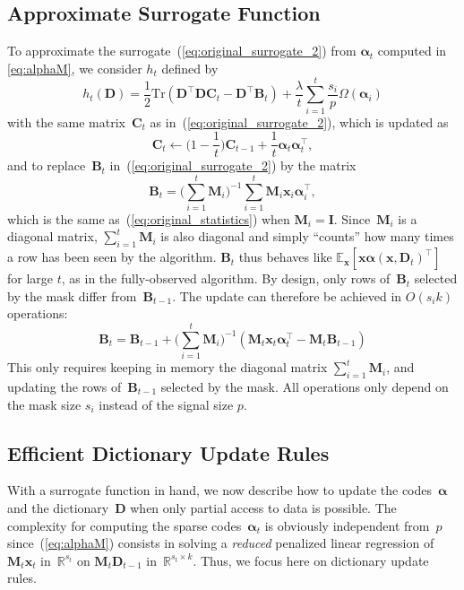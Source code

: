 \documentclass{article}
\def\E{{\mathbb E}}
\def\Real{{\mathbb{R}}}
\def\x{{\mathbf x}}
\def\I{{\mathbf I}}
\def\B{{\mathbf B}}
\def\C{{\mathbf C}}
\def\D{{\mathbf D}}
\def\x{{\mathbf x}}
\def\Real{{\mathbb R}}
\def\M{{\mathbf M}}
\newcommand{\transpose}{^\top}
\newcommand{\balpha}{\boldsymbol{\alpha}}
\begin{document}
\subsection{Approximate Surrogate Function}
To approximate the surrogate~(\ref{eq:original_surrogate_2}) from $\balpha_t$ computed in \eqref{eq:alphaM},
we consider $h_t$ defined by
\begin{equation}
    \label{eq:original_surrogate_3}
    h_t (\D) =  \frac{1}{2} \mathrm{Tr} (\D\transpose\D \C_t
    - \D\transpose \B_t) + \frac{\lambda}{t} \sum_{i = 1}^t \frac{s_i}{p} \Omega(\balpha_i)
\end{equation}
with the same matrix~$\C_t$ as in~(\ref{eq:original_surrogate_2}), which is updated as
\begin{equation}
   \C_t \leftarrow \Big(1-\frac{1}{t}\Big)\C_{t-1} + \frac{1}{t} \balpha_t\balpha_t^\top,
\end{equation}
and to replace~$\B_t$ in~(\ref{eq:original_surrogate_2}) by the matrix
\begin{equation}
   \B_t = \Big( \sum_{i=1}^t \M_i \Big)^{-1} \sum_{i=1}^t \M_i\x_i \balpha_i^\top,
\end{equation}
which is the same as~(\ref{eq:original_statistics}) when $\M_i=\I$.
Since~$\M_i$ is a diagonal matrix, $\sum_{i=1}^t \M_i$ is also diagonal and simply ``counts'' how
many times a row has been seen by the algorithm. $\B_t$ thus behaves like $\E_{\x}[\x \balpha(\x, \D_t)^\top]$ for large $t$, as in the fully-observed algorithm. By design, only rows of~$\B_t$ selected by the mask differ from~$\B_{t-1}$. The update can therefore be achieved in $O(s_i k)$ operations:
\begin{equation}
   \B_t = \B_{t-1} + \Big( \sum_{i=1}^t \M_i \Big)^{-1} \left( \M_t\x_t \balpha_t^\top - \M_t \B_{t-1} \right)
\end{equation}
This only requires keeping in memory the diagonal matrix $\sum_{i=1}^t \M_i$,
and updating the rows of~$\B_{t-1}$ selected by the mask.  All operations only
depend on the mask size $s_i$ instead of the signal size $p$.


\subsection{Efficient Dictionary Update Rules}

With a surrogate function in hand, we now describe how to update the
codes~$\balpha$ and the dictionary~$\D$ when only partial access to data is
possible.
The complexity for computing the sparse codes~$\balpha_t$ is obviously
independent from~$p$ since~(\ref{eq:alphaM}) consists in
solving a \textit{reduced} penalized linear regression of $\M_t \x_t$ in~$\Real^{s_t}$ on $\M_t \D_{t-1}$ in~$\Real^{s_t \times k}$.
Thus, we focus here on dictionary update rules.
\end{document}
